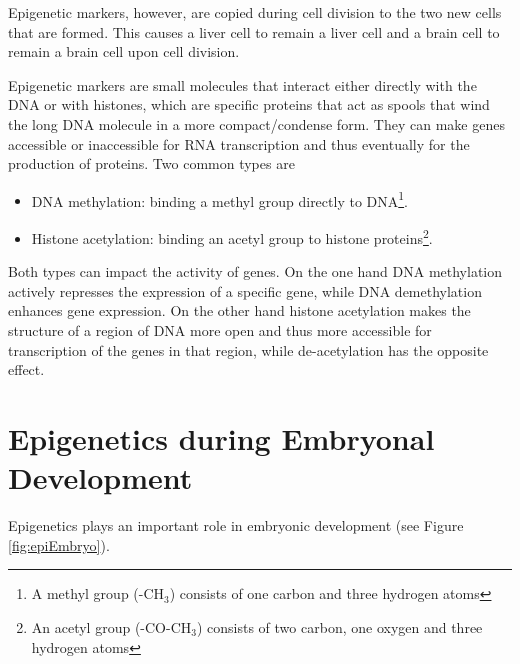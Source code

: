\documentclass[
  11pt,
]{book}
\providecommand{\tightlist}{%
  \setlength{\itemsep}{0pt}\setlength{\parskip}{0pt}}
\begin{document}
Epigenetic markers, however, are copied during cell division to the two new cells that are formed. This causes a liver cell to remain a liver cell and a brain cell to remain a brain cell upon cell division.

Epigenetic markers are small molecules that interact either directly with the DNA or with histones, which are specific proteins that act as spools that wind the long DNA molecule in a more compact/condense form.
They can make genes accessible or inaccessible for RNA transcription and thus eventually for the production of proteins. Two common types are

\begin{itemize}
\tightlist
\item
  DNA methylation: binding a methyl group directly to DNA\footnote{A methyl group (-CH\(_3\)) consists of one carbon and three hydrogen atoms}.
\item
  Histone acetylation: binding an acetyl group to histone proteins\footnote{An acetyl group (-CO-CH\(_3\)) consists of two carbon, one oxygen and three hydrogen atoms}.
\end{itemize}

Both types can impact the activity of genes.
On the one hand DNA methylation actively represses the expression of a specific gene, while DNA demethylation enhances gene expression.
On the other hand histone acetylation makes the structure of a region of DNA more open and thus more accessible for transcription of the genes in that region, while de-acetylation has the opposite effect.

\hypertarget{epigenetics-during-embryonal-development}{%
\section{Epigenetics during Embryonal Development}\label{epigenetics-during-embryonal-development}}

Epigenetics plays an important role in embryonic development (see Figure \ref{fig:epiEmbryo}).
\end{document}
